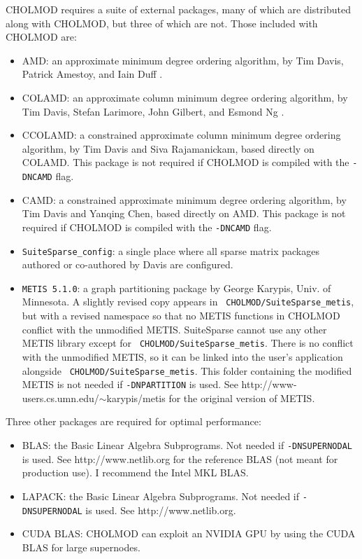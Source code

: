 \documentclass[11pt]{article}
\begin{document}
CHOLMOD requires a suite of external packages, many of which are distributed
along with CHOLMOD, but three of which are not.  Those included with CHOLMOD
are:

\begin{itemize}
\item AMD: an approximate minimum degree ordering algorithm,
    by Tim Davis, Patrick Amestoy, and Iain Duff
    \cite{AmestoyDavisDuff96,AmestoyDavisDuff03}.
\item COLAMD: an approximate column minimum degree ordering algorithm,
    by Tim Davis, Stefan Larimore, John Gilbert, and Esmond Ng
    \cite{DavisGilbertLarimoreNg00_algo,DavisGilbertLarimoreNg00}.
\item CCOLAMD: a constrained approximate column minimum degree ordering
    algorithm, by Tim Davis and Siva Rajamanickam, based directly on COLAMD.
    This package is not required if CHOLMOD is compiled with the {\tt -DNCAMD}
    flag.
\item CAMD: a constrained approximate minimum degree ordering algorithm, by Tim
    Davis and Yanqing Chen, based directly on AMD.  This package is not
    required if CHOLMOD is compiled with the {\tt -DNCAMD} flag.
\item {\tt SuiteSparse\_config}: a single place where all sparse matrix
    packages authored or co-authored by Davis are configured.
\item {\tt METIS 5.1.0}: a graph partitioning package by George Karypis,
    Univ. of Minnesota.  A slightly revised copy appears in {\tt
    CHOLMOD/SuiteSparse\_metis}, but with a revised namespace so that no METIS
    functions in CHOLMOD conflict with the unmodified METIS.  SuiteSparse
    cannot use any other METIS library except for {\tt
    CHOLMOD/SuiteSparse\_metis}.  There is no conflict with the unmodified
    METIS, so it can be linked into the user's application alongside {\tt
    CHOLMOD/SuiteSparse\_metis}.  This folder containing the modified METIS is
    not needed if {\tt -DNPARTITION} is used.  See
    http://www-users.cs.umn.edu/$\sim$karypis/metis for the original version of
    METIS.
\end{itemize}

Three other packages are required for optimal performance:
\begin{itemize}

\item BLAS: the Basic Linear Algebra Subprograms.
    Not needed if {\tt -DNSUPERNODAL} is used.
    See http://www.netlib.org for the reference BLAS (not meant for production
    use).  I recommend the Intel MKL BLAS.
\item LAPACK: the Basic Linear Algebra Subprograms.
    Not needed if {\tt -DNSUPERNODAL} is used.
    See http://www.netlib.org.
\item CUDA BLAS:  CHOLMOD can exploit an NVIDIA GPU by using the CUDA BLAS
    for large supernodes.
\end{itemize}
\end{document}
